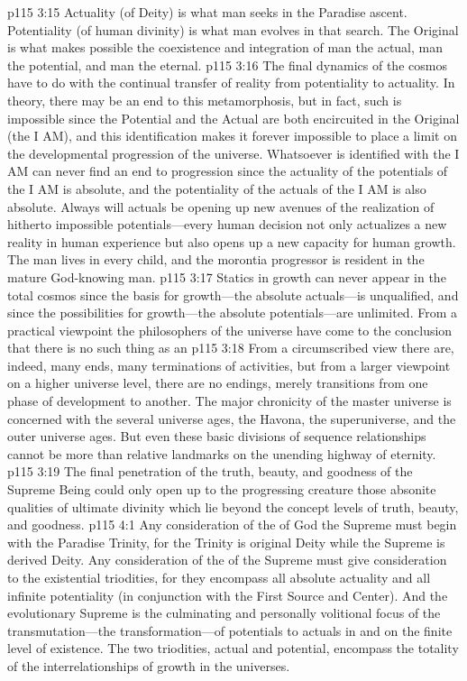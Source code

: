 \vs p115 3:15 Actuality (of Deity) is what man seeks in the Paradise ascent. Potentiality (of human divinity) is what man evolves in that search. The Original is what makes possible the coexistence and integration of man the actual, man the potential, and man the eternal.
\pc \vs p115 3:16 The final dynamics of the cosmos have to do with the continual transfer of reality from potentiality to actuality. In theory, there may be an end to this metamorphosis, but in fact, such is impossible since the Potential and the Actual are both encircuited in the Original (the I AM), and this identification makes it forever impossible to place a limit on the developmental progression of the universe. Whatsoever is identified with the I AM can never find an end to progression since the actuality of the potentials of the I AM is absolute, and the potentiality of the actuals of the I AM is also absolute. Always will actuals be opening up new avenues of the realization of hitherto impossible potentials---every human decision not only actualizes a new reality in human experience but also opens up a new capacity for human growth. The man lives in every child, and the morontia progressor is resident in the mature God\hyp{}knowing man.
\vs p115 3:17 Statics in growth can never appear in the total cosmos since the basis for growth---the absolute actuals---is unqualified, and since the possibilities for growth---the absolute potentials---are unlimited. From a practical viewpoint the philosophers of the universe have come to the conclusion that there is no such thing as an 
\vs p115 3:18 From a circumscribed view there are, indeed, many ends, many terminations of activities, but from a larger viewpoint on a higher universe level, there are no endings, merely transitions from one phase of development to another. The major chronicity of the master universe is concerned with the several universe ages, the Havona, the superuniverse, and the outer universe ages. But even these basic divisions of sequence relationships cannot be more than relative landmarks on the unending highway of eternity.
\vs p115 3:19 The final penetration of the truth, beauty, and goodness of the Supreme Being could only open up to the progressing creature those absonite qualities of ultimate divinity which lie beyond the concept levels of truth, beauty, and goodness.
\vs p115 4:1 Any consideration of the  of God the Supreme must begin with the Paradise Trinity, for the Trinity is original Deity while the Supreme is derived Deity. Any consideration of the  of the Supreme must give consideration to the existential triodities, for they encompass all absolute actuality and all infinite potentiality (in conjunction with the First Source and Center). And the evolutionary Supreme is the culminating and personally volitional focus of the transmutation---the transformation---of potentials to actuals in and on the finite level of existence. The two triodities, actual and potential, encompass the totality of the interrelationships of growth in the universes.
